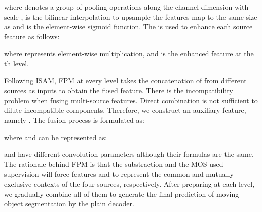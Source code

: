 \documentclass[sigconf]{acmart}
\begin{document}
where  denotes a group of pooling operations along the channel dimension with scale ,  is the bilinear interpolation to upsample the features map to the same size as  and  is the element-wise sigmoid function.  The  is used to enhance each source feature as follows: 

where  represents element-wise multiplication, and  is the enhanced feature at the th level.









Following ISAM, FPM at every level takes the concatenation of  from different sources as inputs to obtain the fused feature. There is the incompatibility problem when fusing multi-source features. Direct combination  is not sufficient to dilute incompatible components. Therefore, we construct an auxiliary feature, namely .
The fusion process is formulated as:

where  and  can be represented as:  

 and  have different convolution parameters although their formulas are the same. The rationale behind FPM is that the substraction and the MOS-used supervision will force features  and  to represent the common and mutually-exclusive contexts of the four sources, respectively.  After preparing  at each level, we gradually combine all of them to generate the final prediction  of moving object segmentation by the plain decoder.
\end{document}
